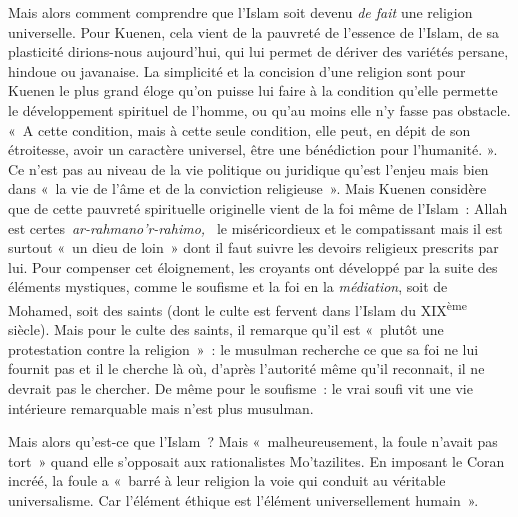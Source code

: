 Mais alors comment comprendre que l'Islam soit devenu \emph{de fait} une
religion universelle. Pour Kuenen, cela vient de la pauvreté de
l'essence de l'Islam, de sa plasticité dirions-nous aujourd'hui, qui lui
permet de dériver des variétés persane, hindoue ou javanaise. La
simplicité et la concision d'une religion sont pour Kuenen le plus grand
éloge qu'on puisse lui faire à la condition qu'elle permette le
développement spirituel de l'homme, ou qu'au moins elle n'y fasse pas
obstacle. «~A cette condition, mais à cette seule condition, elle peut,
en dépit de son étroitesse, avoir un caractère universel, être une
bénédiction pour l'humanité. ». Ce n'est pas au
niveau de la vie politique ou juridique qu'est l'enjeu mais bien dans
«~la vie de l'âme et de la conviction religieuse~». Mais Kuenen
considère que de cette pauvreté spirituelle originelle vient de la foi
même de l'Islam~: Allah est certes~\emph{ar-rahmano'r-rahimo,~} le
miséricordieux et le compatissant mais il est surtout «~un dieu de
loin~» dont il faut suivre les devoirs religieux
prescrits par lui. Pour compenser cet éloignement, les croyants ont
développé par la suite des éléments mystiques, comme le soufisme et la
foi en la \emph{médiation}, soit de Mohamed, soit des saints (dont le
culte est fervent dans l'Islam du XIX\textsuperscript{ème} siècle). Mais
pour le culte des saints, il remarque qu'il est «~plutôt une
protestation contre la religion~»~: le musulman
recherche ce que sa foi ne lui fournit pas et il le cherche là où,
d'après l'autorité même qu'il reconnait, il ne devrait pas le chercher.
De même pour le soufisme~: le vrai soufi vit une vie intérieure
remarquable mais n'est plus musulman.

Mais alors qu'est-ce que l'Islam~? Mais «~malheureusement, la foule
n'avait pas tort~» quand elle s'opposait aux rationalistes Mo'tazilites.
En imposant le Coran incréé, la foule a «~barré à leur religion la voie
qui conduit au véritable universalisme. Car l'élément éthique est
l'élément universellement humain~».

